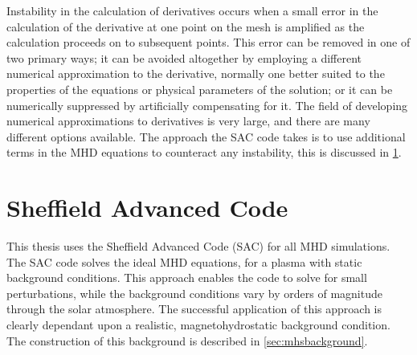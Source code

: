 \documentclass[a4paper,12pt,fourier,authoryear,custommargin]{Classes/PhDThesisPSnPDF}
\begin{document}
Instability in the calculation of derivatives occurs when a small error in the calculation of the derivative at one point on the mesh is amplified as the calculation proceeds on to subsequent points.
This error can be removed in one of two primary ways; it can be avoided altogether by employing a different numerical approximation to the derivative, normally one better suited to the properties of the equations or physical parameters of the solution; or it can be numerically suppressed by artificially compensating for it.
The field of developing numerical approximations to derivatives is very large, and there are many different options available.
The approach the SAC code takes is to use additional terms in the MHD equations to counteract any instability, this is discussed in \cref{sec:SAC}.


\section{Sheffield Advanced Code}\label{sec:SAC}

This thesis uses the Sheffield Advanced Code (SAC) \citep{shelyag2008} for all MHD simulations.
The SAC code solves the ideal MHD equations, for a plasma with static background conditions.
This approach enables the code to solve for small perturbations, while the background conditions vary by orders of magnitude through the solar atmosphere.
The successful application of this approach is clearly dependant upon a realistic, magnetohydrostatic background condition.
The construction of this background is described in \cref{sec:mhsbackground}.
\end{document}
